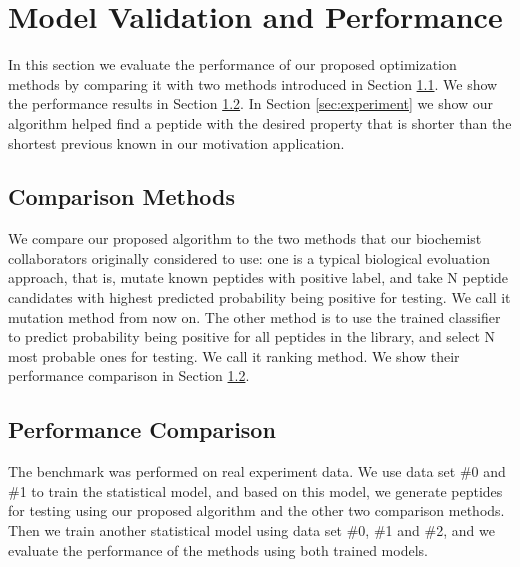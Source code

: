 \documentclass[opre,nonblindrev]{informs3} %
\begin{document}
\section{Model Validation and Performance}
In this section we evaluate the performance of our proposed optimization methods by comparing it with two methods introduced in Section \ref{sec:comparison methods}. We show the performance results in Section \ref{sec:performance}. In Section \ref{sec:experiment} we show our algorithm helped find a peptide with the desired property that is shorter than the shortest previous known in our motivation application.

\subsection{Comparison Methods} \label{sec:comparison methods}
We compare our proposed algorithm to the two methods that our biochemist collaborators originally considered to use: one is a typical biological evoluation approach, that is, mutate known peptides with positive label, and take N peptide candidates with highest predicted probability being positive for testing. We call it mutation method from now on. The other method is to use the trained classifier to predict probability being positive for all peptides in the library, and select N most probable ones for testing. We call it ranking method. We show their performance comparison in Section \ref{sec:performance}.

\subsection{Performance Comparison} \label{sec:performance}
The benchmark was performed on real experiment data. We use data set \#0 and \#1 to train the statistical model, and based on this model, we generate peptides for testing using our proposed algorithm and the other two comparison methods. Then we train another statistical model using data set \#0, \#1 and \#2, and we evaluate the performance of the methods using both trained models.
\end{document}
